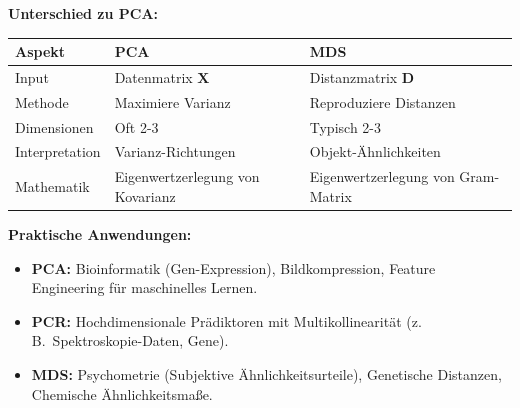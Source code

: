 
\textbf{Unterschied zu PCA:}
\begin{table}[h]
    \centering
    \small
    \begin{tabular}{|l|l|l|}
        \hline
        \textbf{Aspekt} & \textbf{PCA} & \textbf{MDS} \\
        \hline
        Input & Datenmatrix $\mathbf{X}$ & Distanzmatrix $\mathbf{D}$ \\
        \hline
        Methode & Maximiere Varianz & Reproduziere Distanzen \\
        \hline
        Dimensionen & Oft 2-3 & Typisch 2-3 \\
        \hline
        Interpretation & Varianz-Richtungen & Objekt-Ähnlichkeiten \\
        \hline
        Mathematik & Eigenwertzerlegung von Kovarianz & Eigenwertzerlegung von Gram-Matrix \\
        \hline
    \end{tabular}
\end{table}

\textbf{Praktische Anwendungen:}
\begin{itemize}[leftmargin=1.5em]
    \item \textbf{PCA:} Bioinformatik (Gen-Expression), Bildkompression, Feature Engineering für maschinelles Lernen.
    \item \textbf{PCR:} Hochdimensionale Prädiktoren mit Multikollinearität (z.\,B.\ Spektroskopie-Daten, Gene).
    \item \textbf{MDS:} Psychometrie (Subjektive Ähnlichkeitsurteile), Genetische Distanzen, Chemische Ähnlichkeitsmaße.
\end{itemize}


